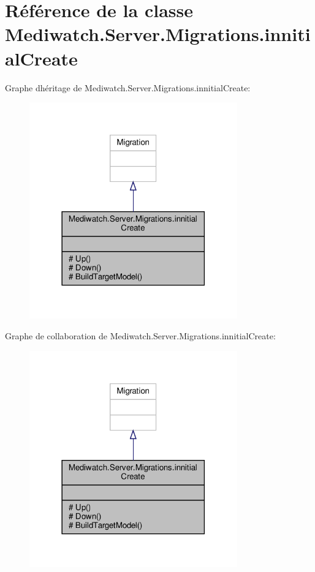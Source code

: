 \hypertarget{class_mediwatch_1_1_server_1_1_migrations_1_1innitial_create}{}\section{Référence de la classe Mediwatch.\+Server.\+Migrations.\+innitial\+Create}
\label{class_mediwatch_1_1_server_1_1_migrations_1_1innitial_create}


Graphe d\textquotesingle{}héritage de Mediwatch.\+Server.\+Migrations.\+innitial\+Create\+:\nopagebreak
\begin{figure}[H]
\begin{center}
\leavevmode
\includegraphics[width=254pt]{class_mediwatch_1_1_server_1_1_migrations_1_1innitial_create__inherit__graph}
\end{center}
\end{figure}


Graphe de collaboration de Mediwatch.\+Server.\+Migrations.\+innitial\+Create\+:\nopagebreak
\begin{figure}[H]
\begin{center}
\leavevmode
\includegraphics[width=254pt]{class_mediwatch_1_1_server_1_1_migrations_1_1innitial_create__coll__graph}
\end{center}
\end{figure}
